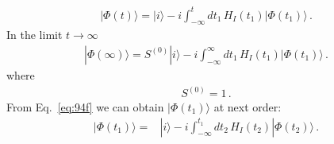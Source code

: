 \begin{align}
\label{eq:94f}
  |\Phi(t)\rangle=|i\rangle-i\int_{-\infty}^t d t_1\,H_I(t_1)|\Phi(t_1)\rangle\,.
\end{align}
In the limit $t\to\infty$
\begin{align}
  |\Phi(\infty)\rangle=S^{(0)}|i\rangle-i\int_{-\infty}^\infty d t_1\,H_I(t_1)|\Phi(t_1)\rangle\,.
\end{align}
where 
\begin{align}
  S^{(0)}=1\,.
\end{align}
From Eq.~\eqref{eq:94f} we can obtain $|\Phi(t_1)\rangle$ at next order:
\begin{align}
  |\Phi(t_1)\rangle=&|i\rangle-i\int_{-\infty}^{t_1} d t_2\,H_I(t_2)|\Phi(t_2)\rangle\,.
\end{align}


